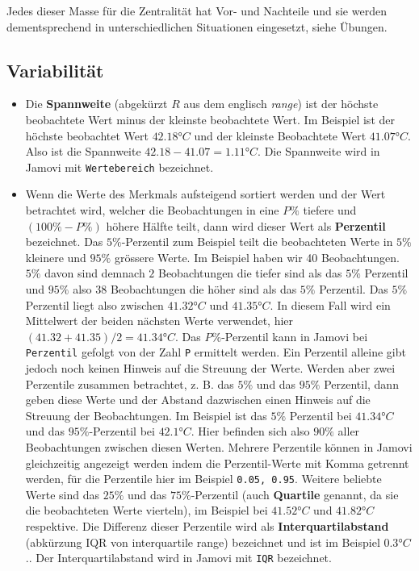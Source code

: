 \documentclass[
]{book}
\providecommand{\tightlist}{%
  \setlength{\itemsep}{0pt}\setlength{\parskip}{0pt}}
\theoremstyle{definition}
\theoremstyle{definition}
\theoremstyle{definition}
\theoremstyle{definition}
\theoremstyle{remark}
\begin{document}
Jedes dieser Masse für die Zentralität hat Vor- und Nachteile und sie werden dementsprechend in unterschiedlichen Situationen eingesetzt, siehe Übungen.

\subsection{Variabilität}\label{variabilitaet}

\begin{itemize}
\tightlist
\item
  \label{customdef-spannweite}{Die \textbf{Spannweite} (abgekürzt \(R\) aus dem englisch \emph{range}) ist der höchste beobachtete Wert minus der kleinste beobachtete Wert}. Im Beispiel ist der höchste beobachtet Wert \(42.18° C\) und der kleinste Beobachtete Wert \(41.07° C\). Also ist die Spannweite \(42.18 - 41.07 = 1.11° C\). Die Spannweite wird in Jamovi mit \texttt{Wertebereich} bezeichnet.
\item
  \label{customdef-perzentil}{Wenn die Werte des Merkmals aufsteigend sortiert werden und der Wert betrachtet wird, welcher die Beobachtungen in eine \(P\%\) tiefere und \((100\% - P\%)\) höhere Hälfte teilt, dann wird dieser Wert als \textbf{Perzentil} bezeichnet.} Das \(5\%\)-Perzentil zum Beispiel teilt die beobachteten Werte in \(5\%\) kleinere und \(95\%\) grössere Werte. Im Beispiel haben wir 40 Beobachtungen. \(5\%\) davon sind demnach \(2\) Beobachtungen die tiefer sind als das \(5\%\) Perzentil und \(95\%\) also \(38\) Beobachtungen die höher sind als das \(5\%\) Perzentil. Das \(5\%\) Perzentil liegt also zwischen \(41.32° C\) und \(41.35° C\). In diesem Fall wird ein Mittelwert der beiden nächsten Werte verwendet, hier \((41.32 + 41.35)/2=41.34° C\). Das \(P\%\)-Perzentil kann in Jamovi bei \texttt{Perzentil} gefolgt von der Zahl \texttt{P} ermittelt werden. Ein Perzentil alleine gibt jedoch noch keinen Hinweis auf die Streuung der Werte. Werden aber zwei Perzentile zusammen betrachtet, z. B. das \(5\%\) und das \(95\%\) Perzentil, dann geben diese Werte und der Abstand dazwischen einen Hinweis auf die Streuung der Beobachtungen. Im Beispiel ist das \(5\%\) Perzentil bei \(41.34° C\) und das \(95\%\)-Perzentil bei \(42.1° C\). Hier befinden sich also \(90\%\) aller Beobachtungen zwischen diesen Werten. Mehrere Perzentile können in Jamovi gleichzeitig angezeigt werden indem die Perzentil-Werte mit Komma getrennt werden, für die Perzentile hier im Beispiel \texttt{0.05,\ 0.95}. \label{customdef-quartile}{Weitere beliebte Werte sind das \(25\%\) und das \(75\%\)-Perzentil (auch \textbf{Quartile} genannt, da sie die beobachteten Werte vierteln), im Beispiel bei \(41.52° C\) und \(41.82° C\) respektive.} \label{customdef-iqr}{Die Differenz dieser Perzentile wird als \textbf{Interquartilabstand} (abkürzung IQR von interquartile range) bezeichnet und ist im Beispiel \(0.3° C\).}. Der Interquartilabstand wird in Jamovi mit \texttt{IQR} bezeichnet.

\end{itemize}
\end{document}
